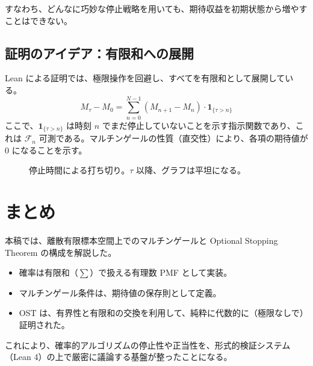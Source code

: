 \documentclass[a4paper,11pt]{article}
\theoremstyle{definition}
\newcommand{\Ex}[1]{\mathbb{E}[#1]}
\begin{document}
すなわち、どんなに巧妙な停止戦略を用いても、期待収益を初期状態から増やすことはできない。

\subsection{証明のアイデア：有限和への展開}
Lean による証明では、極限操作を回避し、すべてを有限和として展開している。
\[ M_{\tau} - M_0 = \sum_{n=0}^{N-1} (M_{n+1} - M_n) \cdot \mathbf{1}_{\{\tau > n\}} \]
ここで、$\mathbf{1}_{\{\tau > n\}}$ は時刻 $n$ でまだ停止していないことを示す指示関数であり、これは $\mathcal{F}_n$ 可測である。マルチンゲールの性質（直交性）により、各項の期待値が $0$ になることを示す。

\begin{figure}[h]
    \centering
    \caption{停止時間による打ち切り。$\tau$ 以降、グラフは平坦になる。}
\end{figure}

\section{まとめ}
本稿では、離散有限標本空間上でのマルチンゲールと Optional Stopping Theorem の構成を解説した。
\begin{itemize}
    \item 確率は有限和（$\sum$）で扱える有理数 PMF として実装。
    \item マルチンゲール条件は、期待値の保存則として定義。
    \item OST は、有界性と有限和の交換を利用して、純粋に代数的に（極限なしで）証明された。
\end{itemize}
これにより、確率的アルゴリズムの停止性や正当性を、形式的検証システム（Lean 4）の上で厳密に議論する基盤が整ったことになる。
\end{document}
